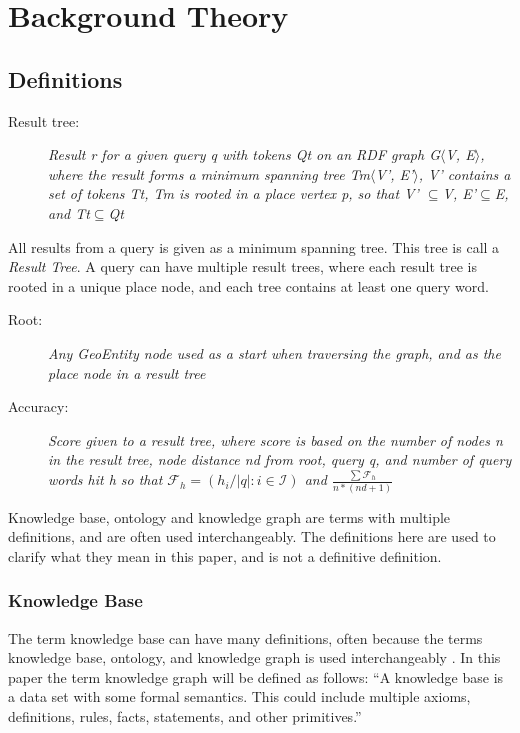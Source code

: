 \chapter{Background Theory}
\label{cha:background_theory}

\section{Definitions}
\begin{description}
    \item[Result tree:] {\em Result r for a given query q with tokens Qt on an RDF graph G$\langle$V, E$\rangle$, where the result forms a minimum spanning tree Tm$\langle$V', E'$\rangle$, V' contains a set of tokens Tt, Tm is rooted in a place vertex p, so that V' $\subseteq$V, E'$\subseteq$E, and Tt$\subseteq$Qt}
\end{description}
All results from a query is given as a minimum spanning tree. This tree is call a {\em Result Tree}. A query can have multiple result trees, where each result tree is rooted in a unique place node, and each tree contains at least one query word.

\begin{description}
    \item[Root:] {\em Any GeoEntity node used as a start when traversing the graph, and as the place node in a result tree}
\end{description}

\begin{description}
    \item[Accuracy:] {\em Score given to a result tree, where score is based on the number of nodes n in the result tree, node distance nd from root, query q, and number of query words hit h so that $\mathcal{F}_h = (h_i/\left\lvert q \right\rvert : i \in \mathcal{I})$ and $ \frac{\sum \mathcal{F}_h}{n*(nd+1)}$}
\end{description}


Knowledge base, ontology and knowledge graph are terms with multiple definitions, and are often used interchangeably. The definitions here are used to clarify what they mean in this paper, and is not a definitive definition.

\subsection{Knowledge Base}
The term knowledge base can have many definitions, often because the terms knowledge base, ontology, and knowledge graph is used interchangeably \citep{KGDef}. In this paper the term knowledge graph will be defined as follows: ``A knowledge base is a data set with some formal semantics. This could include multiple axioms, definitions, rules, facts, statements, and other primitives.'' \citep{davies2006semantic}

